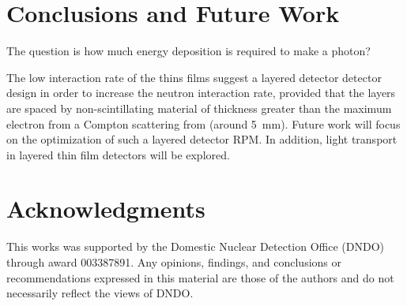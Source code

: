 \documentclass[draftcls,onecolumn]{IEEEtran}
\begin{document}
\section{Conclusions and Future Work}
\label{sec:Conclusions}

The question is how much energy deposition is required to make a photon?

The low interaction rate of the thins films suggest a layered detector detector design in order to increase the neutron interaction rate, provided that the layers are spaced by non-scintillating material of thickness greater than the maximum electron from a Compton scattering from  (around \SI{5}{\mm}).
Future work will focus on the optimization of such a layered detector RPM.
In addition, light transport in layered thin film detectors will be explored.
\section{Acknowledgments}
This works was supported by the Domestic Nuclear Detection Office (DNDO) through award 003387891.
Any opinions, findings, and conclusions or recommendations expressed in this material are those of the authors and do not necessarily reflect the views of DNDO.


\end{document}
